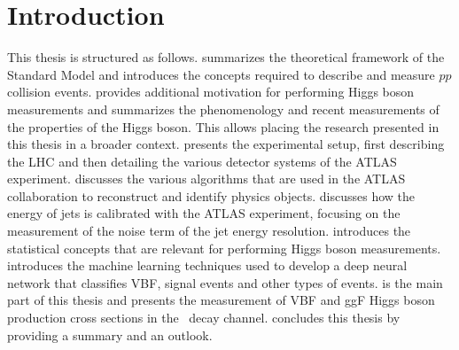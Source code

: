 \chapter{Introduction}
\label{chap:introduction}




\quad \newline

\noindent This thesis is structured as follows.  summarizes the theoretical framework of the Standard Model and introduces the concepts required to describe and measure $pp$ collision events.
 provides additional motivation for performing Higgs boson measurements and summarizes the phenomenology and recent measurements of the properties of the Higgs boson. This allows placing the research presented in this thesis in a broader context.
 presents the experimental setup, first describing the LHC and then detailing the various detector systems of the ATLAS experiment.
 discusses the various algorithms that are used in the ATLAS collaboration to reconstruct and identify physics objects.
 discusses how the energy of jets is calibrated with the ATLAS experiment, focusing on the measurement of the noise term of the jet energy resolution.
 introduces the statistical concepts that are relevant for performing Higgs boson measurements.
 introduces the machine learning techniques used to develop a deep neural network that classifies VBF, \HWW signal events and other types of events.
 is the main part of this thesis and presents the measurement of VBF and ggF Higgs boson production cross sections in the \HWW\ decay channel.
 concludes this thesis by providing a summary and an outlook.






